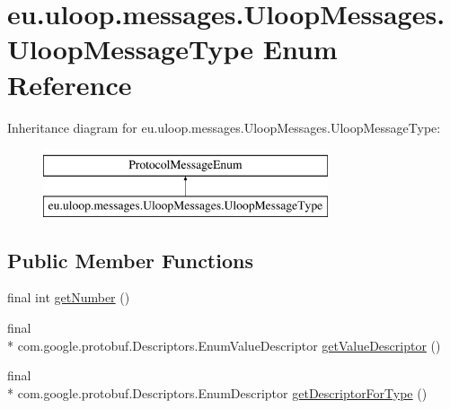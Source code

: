 \hypertarget{enumeu_1_1uloop_1_1messages_1_1UloopMessages_1_1UloopMessageType}{\section{eu.\+uloop.\+messages.\+Uloop\+Messages.\+Uloop\+Message\+Type Enum Reference}
\label{enumeu_1_1uloop_1_1messages_1_1UloopMessages_1_1UloopMessageType}
}
Inheritance diagram for eu.\+uloop.\+messages.\+Uloop\+Messages.\+Uloop\+Message\+Type\+:\begin{figure}[H]
\begin{center}
\leavevmode
\includegraphics[height=2.000000cm]{enumeu_1_1uloop_1_1messages_1_1UloopMessages_1_1UloopMessageType}
\end{center}
\end{figure}
\subsection*{Public Member Functions}
\begin{DoxyCompactItemize}
\item 
final int \hyperlink{enumeu_1_1uloop_1_1messages_1_1UloopMessages_1_1UloopMessageType_abcc6d8ac19328ab0a00f00f7048a8eae}{get\+Number} ()
\item 
final \\*
com.\+google.\+protobuf.\+Descriptors.\+Enum\+Value\+Descriptor \hyperlink{enumeu_1_1uloop_1_1messages_1_1UloopMessages_1_1UloopMessageType_a267033fca5257cd3b9c671114828e754}{get\+Value\+Descriptor} ()
\item 
final \\*
com.\+google.\+protobuf.\+Descriptors.\+Enum\+Descriptor \hyperlink{enumeu_1_1uloop_1_1messages_1_1UloopMessages_1_1UloopMessageType_a0a5b813f886253f042d45af35eb85772}{get\+Descriptor\+For\+Type} ()
\end{DoxyCompactItemize}
